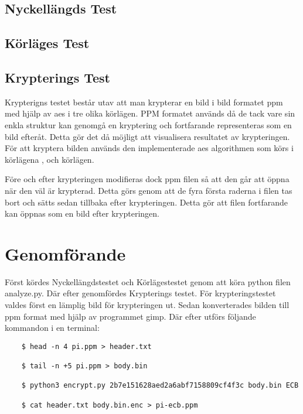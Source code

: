 \subsection{Nyckellängds Test} %
\label{sec:nyckellangd-test}


\subsection{Körläges Test} %
\label{sec:körlages-test}


\subsection{Krypterings Test} %
\label{sec:krypterings-test}
Krypterigns testet består utav att man krypterar en bild i bild formatet \gls{ppm} med hjälp av \acrshort{aes} i tre olika körlägen.
PPM formatet används då de tack vare sin enkla struktur kan genomgå en kryptering och fortfarande representeras som en bild
efteråt. Detta gör det då möjligt att visualisera resultatet av krypteringen. För att kryptera bilden används den implementerade
\acrshort{aes} algorithmen som körs i körlägena ,  och  körlägen.

Före och efter krypteringen modifieras dock \gls{ppm} filen så att den går att öppna när den väl är krypterad. Detta görs genom att de fyra
första raderna i filen tas bort och sätts sedan tillbaka efter krypteringen. Detta gör att filen fortfarande kan öppnas som en bild
efter krypteringen.

\section{Genomförande} %
Först kördes Nyckellängdstestet och Körlägestestet genom att köra \gls{python} filen analyze.py. Där efter
genomfördes Krypterings testet. För krypteringstestet valdes först en lämplig bild för krypteringen ut. Sedan
konverterades bilden till \gls{ppm} format med hjälp av programmet \gls{gimp}. Där efter utförs följande kommandon i en terminal:

\begin{verbatim}
    $ head -n 4 pi.ppm > header.txt

    $ tail -n +5 pi.ppm > body.bin

    $ python3 encrypt.py 2b7e151628aed2a6abf7158809cf4f3c body.bin ECB

    $ cat header.txt body.bin.enc > pi-ecb.ppm
\end{verbatim}

